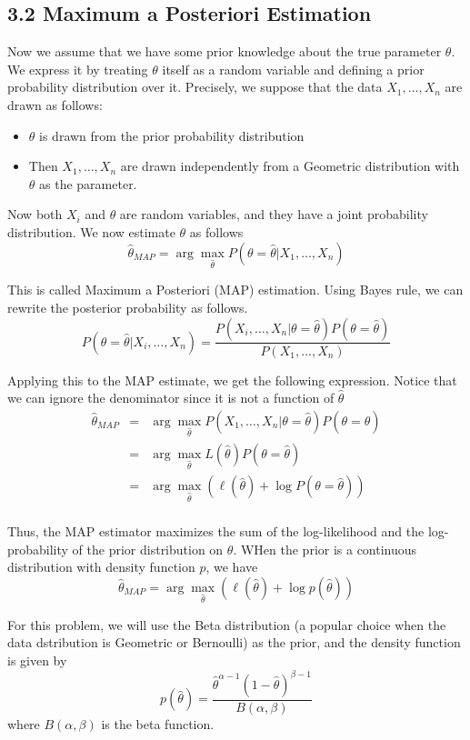 \documentclass{article}
\begin{document}
\subsection*{3.2 Maximum a Posteriori Estimation}

Now we assume that we have some prior knowledge about the true parameter $\theta$. We express it by treating $\theta$ itself as a random variable and defining a prior probability distribution over it. Precisely, we suppose that the data $X_1,\dots,X_n$ are drawn as follows:
\begin{itemize}
	\item $\theta$ is drawn from the prior probability distribution
	\item Then $X_1,\dots,X_n$ are drawn independently from a Geometric distribution with $\theta$ as the parameter.
\end{itemize}
Now both $X_i$ and $\theta$ are random variables, and they have a joint probability distribution. We now estimate $\theta$ as follows
$$\hat{\theta}_{MAP}=\arg\max_{\hat{\theta}}P(\theta=\hat{\theta}|X_1,\dots,X_n)$$

This is called Maximum a Posteriori (MAP) estimation. Using Bayes rule, we can rewrite the posterior probability as follows.
$$P(\theta=\hat{\theta}|X_i,\dots,X_n)=\frac{P(X_i,\dots,X_n|\theta=\hat{\theta})P(\theta=\hat{\theta})}{P(X_1,\dots,X_n)}$$

Applying this to the MAP estimate, we get the following expression. Notice that we can ignore the denominator since it is not a function of $\hat{\theta}$
\begin{equation*}
\begin{array}{rcl}
\hat{\theta}_{MAP} & = & \arg\max_{\hat{\theta}}P(X_1,\dots,X_n|\theta=\hat{\theta})P(\theta=\hat{\theta}) \\
				   & = & \arg\max_{\hat{\theta}}L(\hat{\theta})P(\theta=\hat{\theta}) \\
				   & = & \arg\max_{\hat{\theta}}(\ell(\hat{\theta})+\log P(\theta=\hat{\theta})) \\
\end{array}
\end{equation*}

Thus, the MAP estimator maximizes the sum of the log-likelihood and the log-probability of the prior distribution on $\theta$. WHen the prior is a continuous distribution with density function $p$, we have
$$\hat{\theta}_{MAP}=\arg\max_{\hat{\theta}}(\ell(\hat{\theta})+\log{p(\hat{\theta})})$$

For this problem, we will use the Beta distribution (a popular choice when the data dstribution is Geometric or Bernoulli) as the prior, and the density function is given by
$$p(\hat{\theta})=\frac{\hat{\theta}^{\alpha-1}(1-\hat{\theta})^{\beta-1}}{B(\alpha,\beta)}$$
where $B(\alpha,\beta)$ is the beta function.
\end{document}
